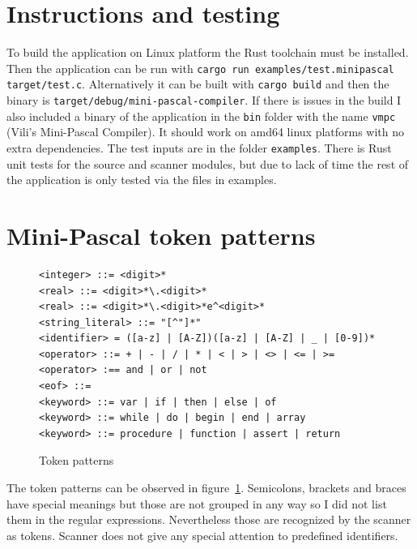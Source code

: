 \documentclass[12pt,a4paper]{article}
\begin{document}
\section{Instructions and testing}

To build the application on Linux platform the Rust toolchain must be
installed. Then the application can be run with \texttt{cargo run
examples/test.minipascal target/test.c}. Alternatively it can be built with
\texttt{cargo build} and then the binary is
\texttt{target/debug/mini-pascal-compiler}. If there is issues in the build I
also included a binary of the application in the \texttt{bin} folder with the
name \texttt{vmpc} (Vili's Mini-Pascal Compiler). It should work on amd64 linux
platforms with no extra dependencies.  The test inputs are in the folder
\texttt{examples}. There is Rust unit tests for the source and scanner modules,
but due to lack of time the rest of the application is only tested via the
files in examples.

\section{Mini-Pascal token patterns}
\begin{figure}
  \caption{Token patterns}\label{token_patterns}
\begin{verbatim}
<integer> ::= <digit>*
<real> ::= <digit>*\.<digit>*
<real> ::= <digit>*\.<digit>*e^<digit>*
<string_literal> ::= "[^"]*" 
<identifier> = ([a-z] | [A-Z])([a-z] | [A-Z] | _ | [0-9])*
<operator> ::= + | - | / | * | < | > | <> | <= | >=
<operator> :== and | or | not
<eof> ::=
<keyword> ::= var | if | then | else | of 
<keyword> ::= while | do | begin | end | array
<keyword> ::= procedure | function | assert | return
\end{verbatim}
\end{figure}

The token patterns can be observed in figure~\ref{token_patterns}.
Semicolons, brackets and braces have special meanings but those are
not grouped in any way so I did not list them in the regular expressions.
Nevertheless those are recognized by the scanner as tokens. Scanner
does not give any special attention to predefined identifiers.
\end{document}
